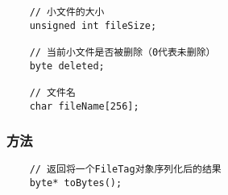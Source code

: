 \documentclass[11pt, a4paper]{article}
\begin{document}
\begin{CJK*}{UTF8}{gbsn}
\begin{lstlisting}
    // 小文件的大小
    unsigned int fileSize;

    // 当前小文件是否被删除（0代表未删除）
    byte deleted;

    // 文件名
    char fileName[256];
  \end{lstlisting}

  \subsubsection{方法}
  
  \begin{lstlisting}
    // 返回将一个FileTag对象序列化后的结果
    byte* toBytes();
  \end{lstlisting}

  \newpage

\end{CJK*}
\end{document}
